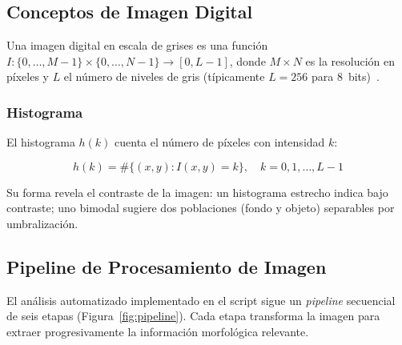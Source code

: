 \documentclass[12pt,a4paper]{article}
\begin{document}
\subsection{Conceptos de Imagen Digital}

Una imagen digital en escala de grises es una función
$I : \{0,\ldots,M-1\} \times \{0,\ldots,N-1\} \to [0,L-1]$, donde
$M \times N$ es la resolución en píxeles y $L$ el número de niveles de
gris (típicamente $L = 256$ para 8~bits)~\cite{gonzalez2018}.

\subsubsection{Histograma}

El histograma $h(k)$ cuenta el número de píxeles con intensidad $k$:

\begin{equation}
	h(k) = \#\{(x,y) : I(x,y) = k\}, \quad k = 0, 1, \ldots, L-1
	\label{eq:histograma}
\end{equation}

Su forma revela el contraste de la imagen: un histograma estrecho indica
bajo contraste; uno bimodal sugiere dos poblaciones (fondo y objeto)
separables por umbralización.

\subsection{Pipeline de Procesamiento de Imagen}

El análisis automatizado implementado en el script sigue un \emph{pipeline}
secuencial de seis etapas (Figura~\ref{fig:pipeline}).  Cada etapa
transforma la imagen para extraer progresivamente la información
morfológica relevante.
\end{document}
